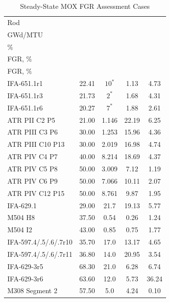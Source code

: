 \begin{table}[htbp]
	\centering
	\caption{Steady-State MOX FGR Assessment Cases}
	\label{tab:steady_state_mox_fgr_assessment_cases}
	\begin{tabularx}{\textwidth}{>{\raggedright\arraybackslash}X c c c c}
		\toprule
		Rod &
		\begin{tabular}[c]{@{}c@{}}
			平均燃耗 \\
			GWd/MTU
		\end{tabular} &
		\begin{tabular}[c]{@{}c@{}}
			Measured FGR \\
			\%
		\end{tabular} &
		\begin{tabular}[c]{@{}c@{}}
			FRAPCON-4.0计算 \\
			FGR, \%
		\end{tabular} &
		\begin{tabular}[c]{@{}c@{}}
			ForMas程序计算 \\
			FGR, \%
		\end{tabular} \\
		\midrule
		
		IFA-651.1r1               & 22.41 & $10^{*}$ & 1.13  & 4.73  \\
		IFA-651.1r3               & 21.73 & $2^{*}$  & 1.68  & 4.31  \\
		IFA-651.1r6               & 20.27 & $7^{*}$  & 1.88  & 2.61  \\
		ATR PII C2 P5             & 21.00 & 1.146    & 22.19 & 6.25  \\
		ATR PIII C3 P6            & 30.00 & 1.253    & 15.96 & 4.36  \\
		ATR PIII C10 P13          & 30.00 & 2.019    & 16.98 & 4.74  \\
		ATR PIV C4 P7             & 40.00 & 8.214    & 18.69 & 4.37  \\
		ATR PIV C5 P8             & 50.00 & 3.009    & 7.12  & 1.19  \\
		ATR PIV C6 P9             & 50.00 & 7.066    & 10.11 & 2.07  \\
		ATR PIV C12 P15           & 50.00 & 8.761    & 9.87  & 1.95  \\
		IFA-629.1                 & 29.00 & 21.7     & 19.13 & 5.77  \\
		M504 H8                   & 37.50 & 0.54     & 0.26  & 1.24  \\
		M504 I2                   & 43.00 & 0.85     & 0.75  & 1.77  \\
		IFA-597.4/.5/.6/.7r10     & 35.70 & 17.0     & 13.17 & 4.65  \\
		IFA-597.4/.5/.6/.7r11     & 36.80 & 14.0     & 20.95 & 3.54  \\
		IFA-629-3r5               & 68.30 & 21.0     & 6.28  & 6.74  \\
		IFA-629-3r6               & 63.60 & 12.0     & 5.73  & 36.24 \\
		M308 Segment 2            & 57.50 & 5.0      & 4.24  & 0.10  \\
		

\end{tabularx}
\end{table}
